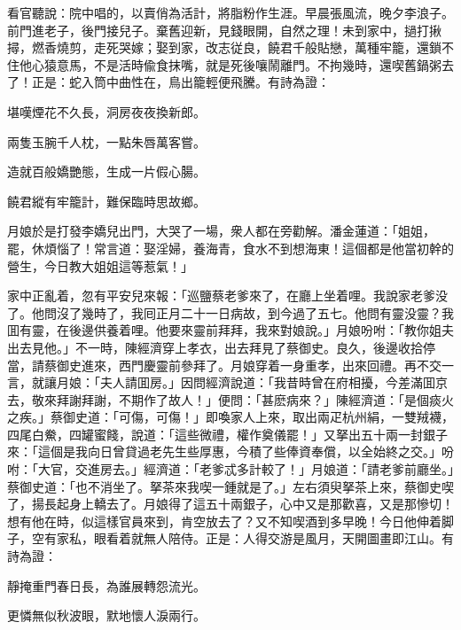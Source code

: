 看官聽說：院中唱的，以賣俏為活計，將脂粉作生涯。早晨張風流，晚夕李浪子。前門進老子，後門接兒子。棄舊迎新，見錢眼開，自然之理！未到家中，撾打揪撏，燃香燒剪，走死哭嫁；娶到家，改志従良，饒君千般貼戀，萬種牢籠，還鎖不住他心猿意馬，不是活時偸食抹嘴，就是死後嚷鬧離門。不拘幾時，還喫舊鍋粥去了！正是：蛇入筒中曲性在，鳥出籠輕便飛騰。有詩為證：

\begin{myquote}
堪嘆煙花不久長，洞房夜夜換新郎。

兩隻玉腕千人枕，一點朱唇萬客嘗。

造就百般嬌艷態，生成一片假心腸。

饒君縱有牢籠計，難保臨時思故鄉。
\end{myquote}

月娘於是打發李嬌兒出門，大哭了一場，衆人都在旁勸解。潘金蓮道：「姐姐，罷，休煩惱了！常言道：娶淫婦，養海青，食水不到想海東！這個都是他當初幹的營生，今日教大姐姐這等惹氣！」

家中正亂着，忽有平安兒來報：「巡鹽蔡老爹來了，在廳上坐着哩。我說家老爹没了。他問沒了幾時了，我囘正月二十一日病故，到今過了五七。他問有靈没靈？我囬有靈，在後邊供養着哩。他要來靈前拜拜，我來對娘說。」月娘吩咐：「教你姐夫出去見他。」不一時，陳經濟穿上孝衣，出去拜見了蔡御史。良久，後邊收拾停當，請蔡御史進來，西門慶靈前參拜了。月娘穿着一身重孝，出來回禮。再不交一言，就讓月娘：「夫人請囬房。」因問經濟說道：「我昔時曾在府相擾，今差滿囬京去，敬來拜謝拜謝，不期作了故人！」便問：「甚麽病來？」陳經濟道：「是個痰火之疾。」蔡御史道：「可傷，可傷！」即喚家人上來，取出兩疋杭州絹，一雙羢襪，四尾白鮝，四罐蜜餞，說道：「這些微禮，權作奠儀罷！」又拏出五十兩一封銀子來：「這個是我向日曾貸過老先生些厚惠，今積了些俸資奉償，以全始終之交。」吩咐：「大官，交進房去。」經濟道：「老爹忒多計較了！」月娘道：「請老爹前廳坐。」蔡御史道：「也不消坐了。拏茶來我喫一鍾就是了。」左右須臾拏茶上來，蔡御史喫了，揚長起身上轎去了。月娘得了這五十兩銀子，心中又是那歡喜，又是那慘切！想有他在時，似這樣官員來到，肯空放去了？又不知喫酒到多早晚！今日他伸着脚子，空有家私，眼看着就無人陪侍。正是：人得交游是風月，天開圖畫即江山。有詩為證：

\begin{myquote}
靜掩重門春日長，為誰展轉怨流光。

更憐無似秋波眼，默地懷人淚兩行。
\end{myquote}


